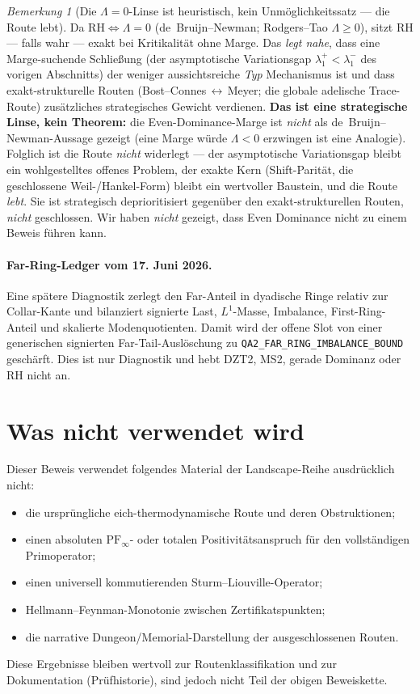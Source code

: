 \documentclass[11pt,a4paper]{article}
\theoremstyle{remark}
\newtheorem{remark}[remark]{Bemerkung}
\theoremstyle{plain}
\begin{document}
\begin{remark}[Die $\Lambda=0$-Linse ist heuristisch, kein Unmöglichkeitssatz --- die Route lebt]
Da $\mathrm{RH}\Leftrightarrow\Lambda=0$ (de~Bruijn--Newman; Rodgers--Tao
$\Lambda\ge 0$), sitzt RH --- falls wahr --- exakt bei Kritikalität ohne Marge.
Das \emph{legt nahe}, dass eine Marge-suchende Schließung (der asymptotische
Variationsgap $\lambda_1^+<\lambda_1^-$ des vorigen Abschnitts) der weniger
aussichtsreiche \emph{Typ} Mechanismus ist und dass exakt-strukturelle Routen
(Bost--Connes\,$\leftrightarrow$\,Meyer; die globale adelische Trace-Route)
zusätzliches strategisches Gewicht verdienen. \textbf{Das ist eine strategische
Linse, kein Theorem:} die Even-Dominance-Marge ist \emph{nicht} als
de~Bruijn--Newman-Aussage gezeigt (\glqq eine Marge würde $\Lambda<0$ erzwingen\grqq{}
ist eine Analogie). Folglich ist die Route \emph{nicht} widerlegt --- der
asymptotische Variationsgap bleibt ein wohlgestelltes offenes Problem, der exakte
Kern (Shift-Parität, die geschlossene Weil-/Hankel-Form) bleibt ein wertvoller
Baustein, und die Route \emph{lebt}. Sie ist strategisch deprioritisiert gegenüber den
exakt-strukturellen Routen, \emph{nicht} geschlossen. Wir haben \emph{nicht}
gezeigt, dass Even Dominance nicht zu einem Beweis führen kann.
\end{remark}

\paragraph{Far-Ring-Ledger vom 17. Juni 2026.}
Eine spätere Diagnostik zerlegt den Far-Anteil in dyadische Ringe relativ zur
Collar-Kante und bilanziert signierte Last, $L^1$-Masse, Imbalance,
First-Ring-Anteil und skalierte Modenquotienten. Damit wird der offene Slot von
einer generischen signierten Far-Tail-Auslöschung zu
\texttt{QA2\_FAR\_RING\_IMBALANCE\_BOUND} geschärft. Dies ist nur Diagnostik
und hebt DZT2, MS2, gerade Dominanz oder RH nicht an.


\section{Was nicht verwendet wird}

Dieser Beweis verwendet folgendes Material der Landscape-Reihe ausdrücklich nicht:
\begin{itemize}[leftmargin=*]
  \item die ursprüngliche eich-thermodynamische Route und deren Obstruktionen;
  \item einen absoluten $\mathrm{PF}_\infty$- oder totalen Positivitätsanspruch für den vollständigen Primoperator;
  \item einen universell kommutierenden Sturm--Liouville-Operator;
  \item Hellmann--Feynman-Monotonie zwischen Zertifikatspunkten;
  \item die narrative Dungeon/Memorial-Darstellung der ausgeschlossenen Routen.
\end{itemize}
Diese Ergebnisse bleiben wertvoll zur Routenklassifikation und zur Dokumentation (Prüfhistorie), sind jedoch nicht Teil der obigen Beweiskette.
\end{document}
